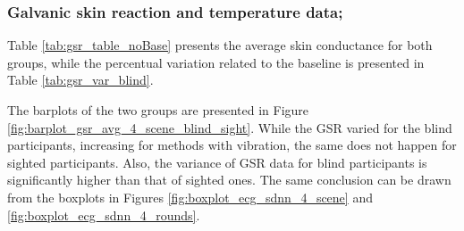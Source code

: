 \subsubsection{Galvanic skin reaction and temperature data;}
\label{subsubsec:results_gsr_temp_2}

Table \ref{tab:gsr_table_noBase} presents the average skin conductance for both groups, while the percentual variation related to the baseline is presented in Table \ref{tab:gsr_var_blind}.





The barplots of the two groups are presented in Figure \ref{fig:barplot_gsr_avg_4_scene_blind_sight}. While the GSR varied for the blind participants, increasing for methods with vibration, the same does not happen for sighted participants. Also, the variance of GSR data for blind participants is significantly higher than that of sighted ones. The same conclusion can be drawn from the boxplots in Figures \ref{fig:boxplot_ecg_sdnn_4_scene} and \ref{fig:boxplot_ecg_sdnn_4_rounds}. 

